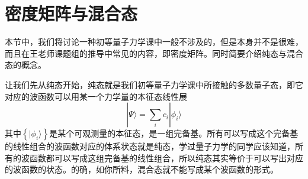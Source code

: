 \documentclass[12pt,a4paper,openany,twoside]{book}
\numberwithin{equation}{section}
\begin{document}
      \section{密度矩阵与混合态}
      \label{Density Matrix}
        本节中，我们将讨论一种初等量子力学课中一般不涉及的，但是本身并不是很难，而且在王老师课题组的推导中常见的内容，即密度矩阵。同时简要介绍纯态与混合态的概念。

        让我们先从纯态开始，纯态就是我们初等量子力学课中所接触的多数量子态，即它对应的波函数可以用某一个力学量的本征态线性展
        \begin{equation}
          | \Psi \rangle =\sum_i c_{i} | \phi_i \rangle
        \end{equation}
        其中$\left\{ | \phi_i \rangle \right\}$是某个可观测量的本征态，是一组完备基。所有可以写成这个完备基的线性组合的波函数对应的体系状态就是纯态，学过量子力学的同学应该知道，所有的波函数都可以写成这组完备基的线性组合，所以纯态其实等价于可以写出对应的波函数的状态。的确，如你所料，混合态就不能写成某个波函数的形式。
\end{document}
